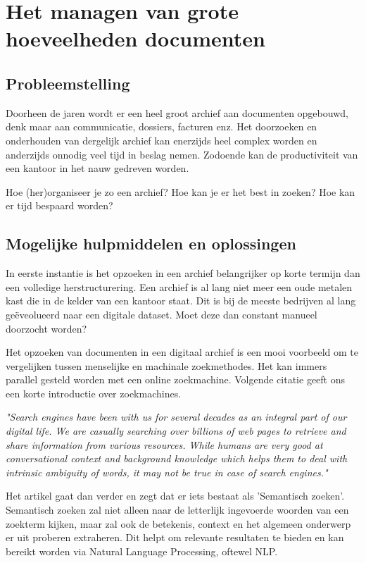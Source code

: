\section{Het managen van grote hoeveelheden documenten}
\subsection{Probleemstelling}
Doorheen de jaren wordt er een heel groot archief aan documenten opgebouwd, denk maar aan communicatie, dossiers, facturen enz.
Het doorzoeken en onderhouden van dergelijk archief kan enerzijds heel complex worden en anderzijds onnodig veel tijd in beslag nemen.
Zodoende kan de productiviteit van een kantoor in het nauw gedreven worden.

Hoe (her)organiseer je zo een archief? Hoe kan je er het best in zoeken? Hoe kan er tijd bespaard worden?

\subsection{Mogelijke hulpmiddelen en oplossingen}
In eerste instantie is het opzoeken in een archief belangrijker op korte termijn dan een volledige herstructurering. Een archief is al lang niet meer een oude metalen kast die in de kelder van een
kantoor staat. Dit is bij de meeste bedrijven al lang geëveolueerd naar een digitale dataset. Moet deze dan constant manueel doorzocht worden?

Het opzoeken van documenten in een digitaal archief is een mooi voorbeeld om te vergelijken tussen menselijke en machinale zoekmethodes.
Het kan immers parallel gesteld worden met een online zoekmachine. Volgende citatie geeft ons een korte introductie over zoekmachines.

\begin{displayquote}
	\textit{"Search engines have been with us for several decades as an integral part of our digital life.
		We are casually searching over billions of web pages to retrieve and share information from various resources.
		While humans are very good at conversational context and background knowledge which helps them to deal with intrinsic ambiguity of words,
		it may not be true in case of search engines."} \autocite{MediumSemanticSearch}
\end{displayquote}

Het artikel gaat dan verder en zegt dat er iets bestaat als 'Semantisch zoeken'. Semantisch zoeken zal niet alleen naar de letterlijk ingevoerde woorden van een zoekterm kijken,
maar zal ook de betekenis, context en het algemeen onderwerp er uit proberen extraheren. Dit helpt om relevante resultaten te bieden en kan bereikt worden via Natural Language Processing, oftewel NLP.

